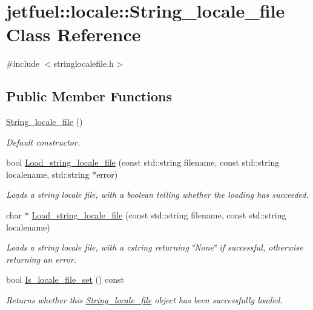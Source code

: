 \hypertarget{classjetfuel_1_1locale_1_1String__locale__file}{}\section{jetfuel\+:\+:locale\+:\+:String\+\_\+locale\+\_\+file Class Reference}
\label{classjetfuel_1_1locale_1_1String__locale__file}


{\ttfamily \#include $<$stringlocalefile.\+h$>$}

\subsection*{Public Member Functions}
\begin{DoxyCompactItemize}
\item 
\hyperlink{classjetfuel_1_1locale_1_1String__locale__file_a98b4ccb05ae738101ec1c4af582aa0d8}{String\+\_\+locale\+\_\+file} ()
\begin{DoxyCompactList}\small\item\em Default constructor. \end{DoxyCompactList}\item 
bool \hyperlink{classjetfuel_1_1locale_1_1String__locale__file_a904609e7cde4eb624cb940cbba642ea0}{Load\+\_\+string\+\_\+locale\+\_\+file} (const std\+::string filename, const std\+::string localename, std\+::string $\ast$error)
\begin{DoxyCompactList}\small\item\em Loads a string locale file, with a boolean telling whether the loading has succeeded. \end{DoxyCompactList}\item 
char $\ast$ \hyperlink{classjetfuel_1_1locale_1_1String__locale__file_a7d689db0ff9e9883ee8a5714311742bf}{Load\+\_\+string\+\_\+locale\+\_\+file} (const std\+::string filename, const std\+::string localename)
\begin{DoxyCompactList}\small\item\em Loads a string locale file, with a cstring returning \char`\"{}\+None\char`\"{} if successful, otherwise returning an error. \end{DoxyCompactList}\item 
bool \hyperlink{classjetfuel_1_1locale_1_1String__locale__file_a66f25007449bac68d94e0cea2c13b313}{Is\+\_\+locale\+\_\+file\+\_\+set} () const
\begin{DoxyCompactList}\small\item\em Returns whether this \hyperlink{classjetfuel_1_1locale_1_1String__locale__file}{String\+\_\+locale\+\_\+file} object has been successfully loaded. \end{DoxyCompactList}\item 

\end{DoxyCompactItemize}
